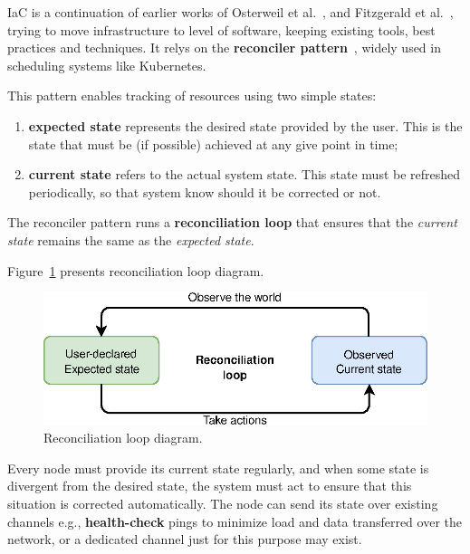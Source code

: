 IaC is a continuation of earlier works of Osterweil et al.~\cite{Osterweil}, and Fitzgerald et al.~\cite{Fitzgerald}, trying to move infrastructure to level of software, keeping existing tools, best practices and techniques. It relys on the \textbf{reconciler pattern}~\cite{luksa2018kubernetes}, widely used in scheduling systems like Kubernetes.

This pattern enables tracking of resources using two simple states:~\label{loop_pattenr} 

\begin{enumerate}[start=1,label={(\bfseries \arabic*)}]
	\item \textbf{expected state} represents the desired state provided by the user. This is the state that must be (if possible) achieved at any give point in time;
	\item \textbf{current state} refers to the actual system state. This state must be refreshed periodically, so that system know should it be corrected or not.
\end{enumerate}

\noindent
The reconciler pattern runs a \textbf{reconciliation loop} that ensures that the \emph{current state} remains the same as the \emph{expected state}.~\label{reconcile_loop} 

Figure~\ref{fig:fig26} presents reconciliation loop diagram.

\begin{figure}[H]
	\begin{center}
		\includegraphics[scale=0.80]{images/Figure26}
	\end{center}
	\vspace{-0.6cm}
	\caption{Reconciliation loop diagram.}
	\label{fig:fig26}
\end{figure}

Every node must provide its current state regularly, and when some state is divergent from the desired state, the system must act to ensure that this situation is corrected automatically. The node can send its state over existing channels e.g., \textbf{health-check} pings to minimize load and data transferred over the network, or a dedicated channel just for this purpose may exist.

